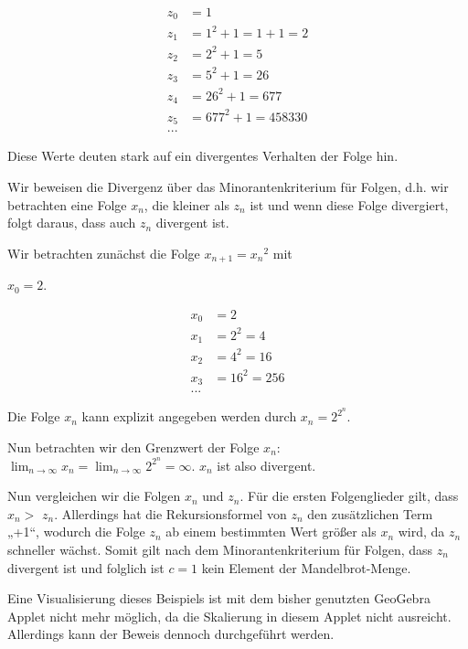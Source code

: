 \documentclass[a4paper, 12pt]{book}
\begin{document}
\begin{align*}
z_{0} &= 1\\
z_{1} &= 1^{2} + 1 = 1 + 1 = 2\\
z_{2} &= 2^{2} + 1 = 5\\
z_{3} &= 5^{2} + 1 = 26\\
z_{4} &= 26^{2} + 1 = 677\\
z_{5} &= 677^{2} + 1 = 458330\\
...
\end{align*}

Diese Werte deuten stark auf ein divergentes Verhalten der Folge hin.

Wir beweisen die Divergenz über das Minorantenkriterium für Folgen, d.h.
wir betrachten eine Folge \(x_{n}\), die kleiner als \(z_{n}\) ist und
wenn diese Folge divergiert, folgt daraus, dass auch \(z_{n}\) divergent
ist.

Wir betrachten zunächst die Folge \(x_{n + 1} = {x_{n}}^{2}\) mit

\(x_{0} = 2\).

\begin{align*}
x_{0} &= 2\\
x_{1} &= 2^{2} = 4\\
x_{2} &= 4^{2} = 16\\
x_{3} &= 16^{2} = 256\\
...
\end{align*}

Die Folge \(x_{n}\) kann explizit angegeben werden durch
\(x_{n} = 2^{2^{n}}\).

Nun betrachten wir den Grenzwert der Folge \(x_{n}\):
\(\lim_{n \rightarrow \infty}x_{n} = \lim_{n \rightarrow \infty}2^{2^{n}} = \infty\).
\(x_{n}\) ist also divergent.

Nun vergleichen wir die Folgen \(x_{n}\) und \(z_{n}\). Für die ersten
Folgenglieder gilt, dass \(x_{n} > \) \(z_{n}\). Allerdings hat die
Rekursionsformel von \(z_{n}\) den zusätzlichen Term „+1``, wodurch die
Folge \(z_{n}\) ab einem bestimmten Wert größer als \(x_{n}\) wird, da
\(z_{n}\) schneller wächst. Somit gilt nach dem Minorantenkriterium für
Folgen, dass \(z_{n}\) divergent ist und folglich ist \(c = 1\) kein
Element der Mandelbrot-Menge. \hfill\blacksquare

Eine Visualisierung dieses Beispiels ist mit dem bisher genutzten
GeoGebra Applet nicht mehr möglich, da die Skalierung in diesem Applet
nicht ausreicht. Allerdings kann der Beweis dennoch durchgeführt werden.
\end{document}
